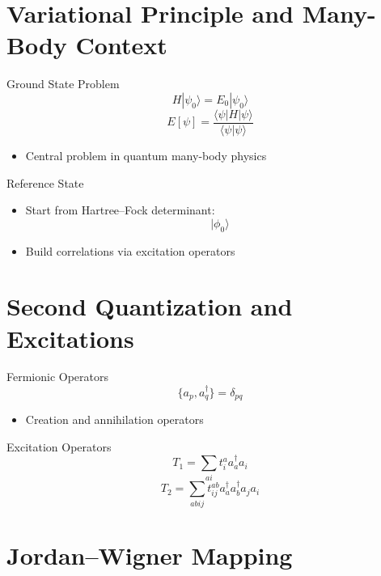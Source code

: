 \documentclass{beamer}
\begin{document}
\section{Variational Principle and Many-Body Context}

\begin{frame}{Ground State Problem}
\[
H|\psi_0\rangle = E_0 |\psi_0\rangle
\]
\[
E[\psi] = \frac{\langle \psi|H|\psi\rangle}{\langle \psi|\psi\rangle}
\]
\begin{itemize}
\item Central problem in quantum many-body physics
\end{itemize}
\end{frame}


\begin{frame}{Reference State}
\begin{itemize}
\item Start from Hartree–Fock determinant:
\[
|\phi_0\rangle
\]
\item Build correlations via excitation operators
\end{itemize}
\end{frame}

\section{Second Quantization and Excitations}

\begin{frame}{Fermionic Operators}
\[
\{a_p, a_q^\dagger\} = \delta_{pq}
\]
\begin{itemize}
\item Creation and annihilation operators
\end{itemize}
\end{frame}


\begin{frame}{Excitation Operators}
\[
T_1 = \sum_{ai} t_i^a a_a^\dagger a_i
\]
\[
T_2 = \sum_{abij} t_{ij}^{ab} a_a^\dagger a_b^\dagger a_j a_i
\]
\end{frame}

\section{Jordan–Wigner Mapping}
\end{document}
